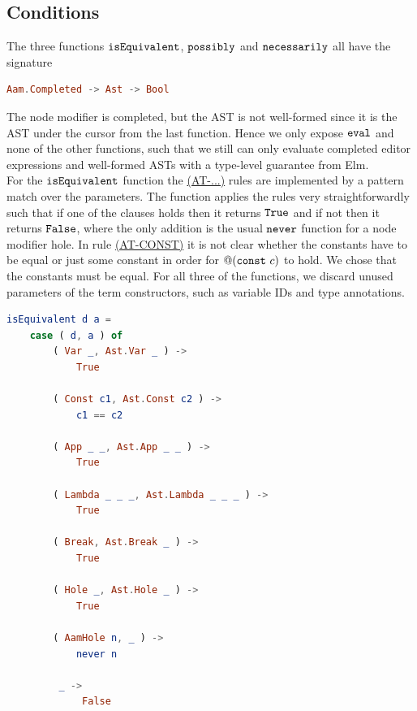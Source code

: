 \subsection{Conditions}

The three functions $\texttt{isEquivalent}$, $\texttt{possibly}$ and
$\texttt{necessarily}$ all have the signature
\begin{lstlisting}[language=elm,%
                   label="eval-eed-signature",%
                   gobble=0,%
                   ]
Aam.Completed -> Ast -> Bool
\end{lstlisting}
The node modifier is completed, but the AST is not well-formed since it
is the AST under the cursor from the last function. Hence we only expose
$\texttt{eval}$ and none of the other functions, such that we still can only
evaluate completed editor expressions and well-formed ASTs with a type-level
guarantee from Elm. \\

For the $\texttt{isEquivalent}$ function the
\hyperref[fig:conditionreductionrules]{(AT-...)} rules are implemented by a
pattern match over the parameters.
The function applies the rules very straightforwardly such that if one of the
clauses holds then it returns $\texttt{True}$ and if not then it returns
$\texttt{False}$, where the only addition is the usual $\texttt{never}$ function
for a node modifier hole. In rule
\hyperref[fig:conditionreductionrules]{(AT-CONST)} it is not clear whether the
constants have to be equal or just some constant in order for $@(\texttt{const}~c)$ to
hold. We chose that the constants must be equal.
For all three of the functions, we discard unused parameters of the term
constructors, such as variable IDs and type annotations.
\begin{lstlisting}[language=elm,%
                   label="eval-aam-isequivalent",%
                   gobble=0,%
                   ]
isEquivalent d a =
    case ( d, a ) of
        ( Var _, Ast.Var _ ) ->
            True

        ( Const c1, Ast.Const c2 ) ->
            c1 == c2

        ( App _ _, Ast.App _ _ ) ->
            True

        ( Lambda _ _ _, Ast.Lambda _ _ _ ) ->
            True

        ( Break, Ast.Break _ ) ->
            True

        ( Hole _, Ast.Hole _ ) ->
            True

        ( AamHole n, _ ) ->
            never n

         _ ->
             False

\end{lstlisting}

